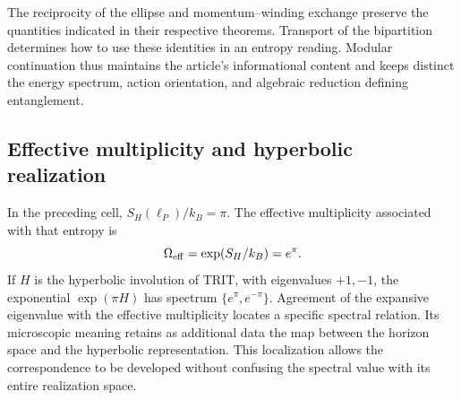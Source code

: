 The reciprocity of the ellipse and momentum--winding exchange
preserve the quantities indicated in their respective theorems. Transport
of the bipartition determines how to use these identities
in an entropy reading. Modular continuation thus
maintains the article's informational content and keeps distinct
the energy spectrum, action orientation, and algebraic reduction
defining entanglement.

\subsection{Effective multiplicity and hyperbolic realization}

In the preceding cell, \(S_H(\ell_P)/k_B=\pi\). The effective
multiplicity associated with that entropy is
\[
 \Omega_{\rm eff}=\exp(S_H/k_B)=e^\pi.
\]
If \(H\) is the hyperbolic involution of TRIT, with eigenvalues
\(+1,-1\), the exponential \(\exp(\pi H)\) has spectrum
\(\{e^\pi,e^{-\pi}\}\). Agreement of the expansive eigenvalue
with the effective multiplicity locates a specific spectral relation.
Its microscopic meaning retains as additional data the map between
the horizon space and the hyperbolic representation. This
localization allows the correspondence to be developed without confusing
the spectral value with its entire realization space.

